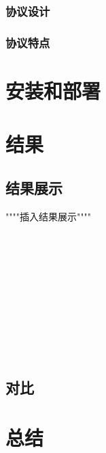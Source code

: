 \documentclass[15pt]{ctexart}
\begin{document}
		\subsubsection{协议设计} %
		\label{ssub:协议设计}
			
		\subsubsection{协议特点} %
		\label{ssub:协议特点}
			
	


\section{安装和部署} %
\label{sec:安装和部署}


\section{结果} %
\label{sec:结果}
\subsection{结果展示} %
\label{sub:结果展示}
\par """"插入结果展示""""
\\
\\
\\
\\
\\
\\
\\
\\
\\
\\
\\
\subsection{对比} %
\label{sub:对比}


\section{总结} %
\label{sec:总结}
\end{document}
